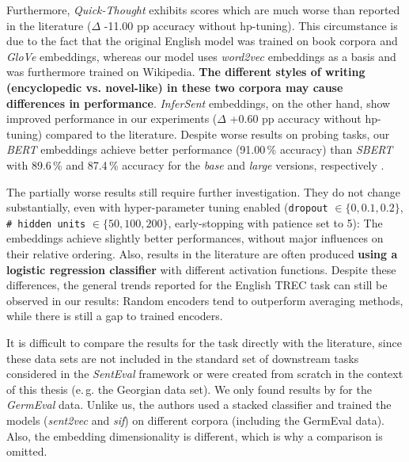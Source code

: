 Furthermore, \textit{Quick-Thought} exhibits scores which are much worse than reported in the literature ($\Delta$ -11.00 pp accuracy without hp-tuning). This circumstance is due to the fact that the original English model was trained on book corpora and \textit{GloVe} embeddings, whereas our model uses \textit{word2vec} embeddings as a basis and was furthermore trained on Wikipedia. \textbf{The different styles of writing (encyclopedic vs. novel-like) in these two corpora may cause differences in performance}. \textit{InferSent} embeddings, on the other hand, show improved performance in our experiments ($\Delta$ +0.60 pp accuracy without hp-tuning) compared to the literature. Despite worse results on probing tasks, our \textit{BERT} embeddings achieve better performance (91.00\,\% accuracy) than \textit{SBERT} with 89.6\,\% and 87.4\,\% accuracy for the \textit{base} and \textit{large} versions, respectively \citep{Reimers.2019}.

The partially worse results still require further investigation. They do not change substantially, even with hyper-parameter tuning enabled (\texttt{dropout} $\in \{0, 0.1, 0.2\}$, \texttt{\# hidden units} $\in \{50, 100, 200\}$, early-stopping with patience set to 5): The embeddings achieve slightly better performances, without major influences on their relative ordering. Also, results in the literature are often produced \textbf{using a logistic regression classifier} with different activation functions. Despite these differences, the general trends reported for the English TREC task can still be observed in our results: Random encoders tend to outperform averaging methods, while there is still a gap to trained encoders.


\vspace*{-5mm}

 It is difficult to compare the results for the  task directly with the literature, since these data sets are not included in the standard set of downstream tasks considered in the \textit{SentEval} framework or were created from scratch in the context of this thesis (e.\,g. the Georgian  data set). We only found results by \citep{Lee.2017} for the \textit{GermEval} data. Unlike us, the authors used a stacked classifier and trained the models (\textit{sent2vec} and \textit{\gls{sif}}) on different corpora (including the GermEval data). Also, the embedding dimensionality is different, which is why a comparison is omitted. 


